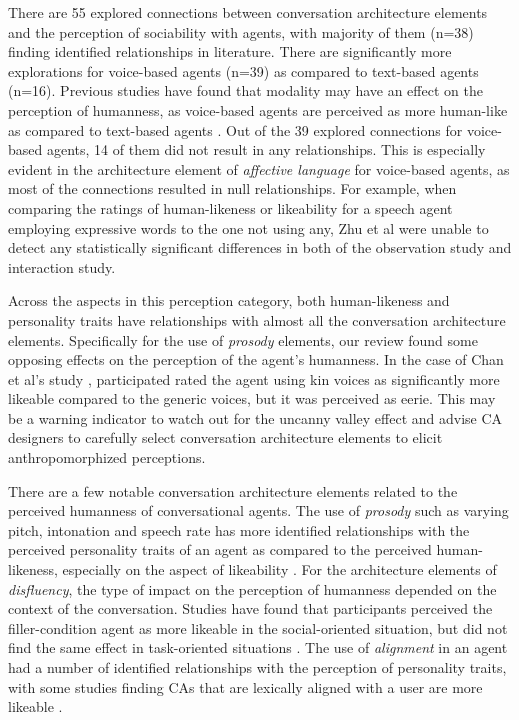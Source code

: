 There are 55 explored connections between conversation architecture elements and the perception of sociability with agents, with majority of them (n=38) finding identified relationships in literature. There are significantly more explorations for voice-based agents (n=39) as compared to text-based agents (n=16). Previous studies have found that modality may have an effect on the perception of humanness, as voice-based agents are perceived as more human-like as compared to text-based agents \cite{cho2019effects}. Out of the 39 explored connections for voice-based agents, 14 of them did not result in any relationships. This is especially evident in the architecture element of \textit{affective language} for voice-based agents, as most of the connections resulted in null relationships. For example, when comparing the ratings of human-likeness or likeability for a speech agent employing expressive words to the one not using any, Zhu et al \cite{zhu2022effects}\cmt{[26]} were unable to detect any statistically significant differences in both of the observation study and interaction study.

Across the aspects in this perception category, both human-likeness and personality traits have relationships with almost all the conversation architecture elements. Specifically for the use of \textit{prosody} elements, our review found some opposing effects on the perception of the agent's humanness. In the case of Chan et al's study \cite{chan2021kinvoices}\cmt{[74]}, participated rated the agent using kin voices as significantly more likeable compared to the generic voices, but it was perceived as eerie. This may be a warning indicator to watch out for the uncanny valley effect \cite{mori2012uncanny} and advise CA designers to carefully select conversation architecture elements to elicit anthropomorphized perceptions.

There are a few notable conversation architecture elements related to the perceived humanness of conversational agents. The use of \textit{prosody} such as varying pitch, intonation and speech rate has more identified relationships with the perceived personality traits of an agent as compared to the perceived human-likeness, especially on the aspect of likeability \cite{choi2020nobody, jestin2022effects, misu2011toward}\cmt{[54][81][83]}. For the architecture elements of \textit{disfluency}, the type of impact on the perception of humanness depended on the context of the conversation. Studies have found that participants perceived the filler-condition agent as more likeable in the social-oriented situation, but did not find the same effect in task-oriented situations \cite{jeong2019exploring, wester2015artificial}\cmt{[10][14]}. The use of \textit{alignment} in an agent had a number of identified relationships with the perception of personality traits, with some studies finding CAs that are lexically aligned with a user are more likeable \cite{huiyang2022improving, linnemann2018can}\cmt{[17][15]}. 